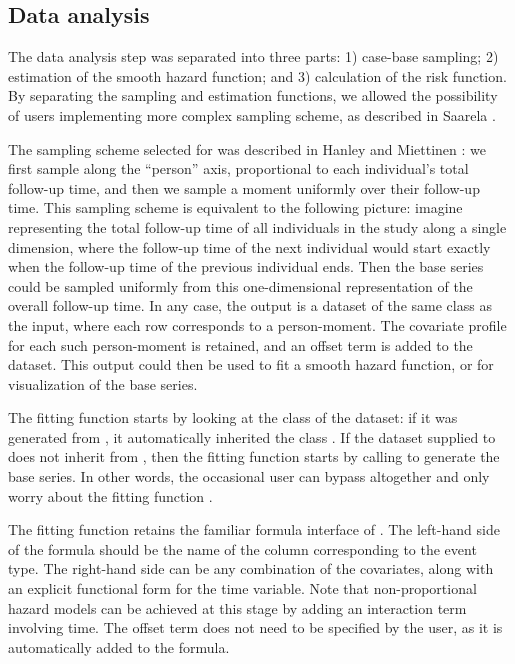 \documentclass[article]{jss}
\begin{document}
\subsection{Data analysis}\label{data-analysis}

The data analysis step was separated into three parts: 1) case-base
sampling; 2) estimation of the smooth hazard function; and 3)
calculation of the risk function. By separating the sampling and
estimation functions, we allowed the possibility of users implementing
more complex sampling scheme, as described in Saarela
\citeyearpar{saarela2016case}.

The sampling scheme selected for  was described in
Hanley and Miettinen \citeyearpar{hanley2009fitting}: we first sample
along the ``person'' axis, proportional to each individual's total
follow-up time, and then we sample a moment uniformly over their
follow-up time. This sampling scheme is equivalent to the following
picture: imagine representing the total follow-up time of all
individuals in the study along a single dimension, where the follow-up
time of the next individual would start exactly when the follow-up time
of the previous individual ends. Then the base series could be sampled
uniformly from this one-dimensional representation of the overall
follow-up time. In any case, the output is a dataset of the same class
as the input, where each row corresponds to a person-moment. The
covariate profile for each such person-moment is retained, and an offset
term is added to the dataset. This output could then be used to fit a
smooth hazard function, or for visualization of the base series.

The fitting function  starts by looking at the
class of the dataset: if it was generated from , it
automatically inherited the class . If the dataset supplied
to  does not inherit from , then the
fitting function starts by calling  to generate the
base series. In other words, the occasional user can bypass
 altogether and only worry about the fitting
function .

The fitting function retains the familiar formula interface of
. The left-hand side of the formula should be the name of the
column corresponding to the event type. The right-hand side can be any
combination of the covariates, along with an explicit functional form
for the time variable. Note that non-proportional hazard models can be
achieved at this stage by adding an interaction term involving time. The
offset term does not need to be specified by the user, as it is
automatically added to the formula.
\end{document}

